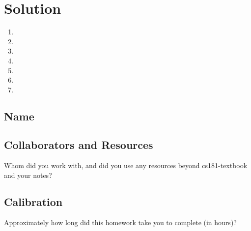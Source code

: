 \documentclass[submit]{harvardml}
\begin{document}
\newpage
\section*{Solution}
\begin{enumerate}
  \item 
  \item 
  \item 
  \item 
  \item 
  \item 
  \item 
\end{enumerate}

\newpage
\subsection*{Name}

\subsection*{Collaborators and Resources}
Whom did you work with, and did you use any resources beyond cs181-textbook and your notes?

\subsection*{Calibration}
Approximately how long did this homework take you to complete (in hours)? 
\end{document}
